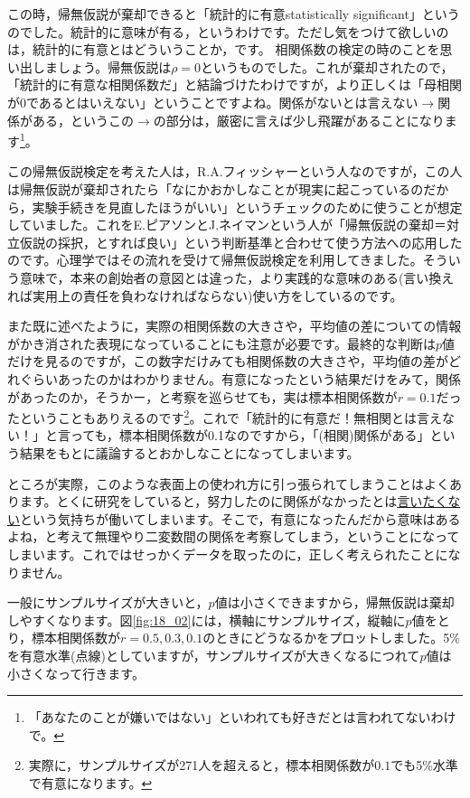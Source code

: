 \documentclass{ltjsbook}
\begin{document}
この時，帰無仮説が棄却できると「統計的に有意statistically significant」というのでした。統計的に意味が有る，というわけです。ただし気をつけて欲しいのは，統計的に有意とはどういうことか，です。
相関係数の検定の時のことを思い出しましょう。帰無仮説は$\rho=0$というものでした。これが棄却されたので，「統計的に有意な相関係数だ」と結論づけたわけですが，より正しくは「母相関が0であるとはいえない」ということですよね。関係がないとは言えない$\to$関係がある，というこの$\to$の部分は，厳密に言えば少し飛躍があることになります\footnote{「あなたのことが嫌いではない」といわれても好きだとは言われてないわけで。}。

この帰無仮説検定を考えた人は，R.A.フィッシャーという人なのですが，この人は帰無仮説が棄却されたら「なにかおかしなことが現実に起こっているのだから，実験手続きを見直したほうがいい」というチェックのために使うことが想定していました。これをE.ピアソンとJ.ネイマンという人が「帰無仮説の棄却＝対立仮説の採択，とすれば良い」という判断基準と合わせて使う方法への応用したのです。心理学ではその流れを受けて帰無仮説検定を利用してきました。そういう意味で，本来の創始者の意図とは違った，より実践的な意味のある(言い換えれば実用上の責任を負わなければならない)使い方をしているのです。

また既に述べたように，実際の相関係数の大きさや，平均値の差についての情報がかき消された表現になっていることにも注意が必要です。最終的な判断は$p$値だけを見るのですが，この数字だけみても相関係数の大きさや，平均値の差がどれぐらいあったのかはわかりません。有意になったという結果だけをみて，関係があったのか，そうかー，と考察を巡らせても，実は標本相関係数が$r=0.1$だったということもありえるのです\footnote{実際に，サンプルサイズが271人を超えると，標本相関係数が$0.1$でも5\%水準で有意になります。}。これで「統計的に有意だ！無相関とは言えない！」と言っても，標本相関係数が0.1なのですから，「(相関)関係がある」という結果をもとに議論するとおかしなことになってしまいます。

ところが実際，このような表面上の使われ方に引っ張られてしまうことはよくあります。とくに研究をしていると，努力したのに関係がなかったとは\underline{言いたくない}という気持ちが働いてしまいます。そこで，有意になったんだから意味はあるよね，と考えて無理やり二変数間の関係を考察してしまう，ということになってしまいます。これではせっかくデータを取ったのに，正しく考えられたことになりません。

一般にサンプルサイズが大きいと，$p$値は小さくできますから，帰無仮説は棄却しやすくなります。図\ref{fig:18_02}には，横軸にサンプルサイズ，縦軸に$p$値をとり，標本相関係数が$r=0.5,0.3,0.1$のときにどうなるかをプロットしました。5\%を有意水準(点線)としていますが，サンプルサイズが大きくなるにつれて$p$値は小さくなって行きます。
\end{document}

